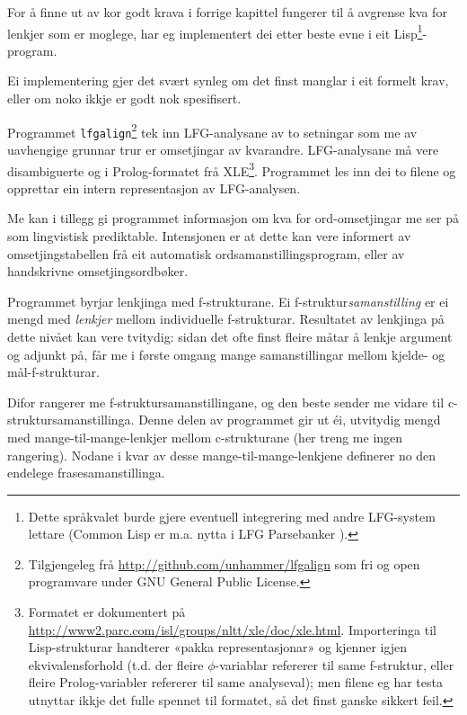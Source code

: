 \documentclass[11pt,a4paper,oneside,draft]{book}
\begin{document}
\label{SEC:implementasjon}

For å finne ut av kor godt krava i forrige kapittel fungerer til å
avgrense kva for lenkjer som er moglege, har eg implementert dei etter
beste evne i eit Lisp\footnote{Dette språkvalet burde gjere eventuell integrering med andre
        LFG-system lettare (Common Lisp er m.a. nytta i LFG
        Parsebanker \citep{rosen2009lpt}). }-program.

 Ei implementering gjer det svært synleg om det finst
manglar i eit formelt krav, eller om noko ikkje er godt nok
spesifisert.

Programmet \texttt{lfgalign}\footnote{Tilgjengeleg frå \href{http://github.com/unhammer/lfgalign}{http://github.com/unhammer/lfgalign} som fri og
       open programvare under GNU General Public License. } tek inn LFG-analysane av to
setningar som me av uavhengige grunnar trur er omsetjingar av
kvarandre. LFG-analysane må vere disambiguerte og i Prolog-formatet
frå XLE\footnote{Formatet er dokumentert på
       \href{http://www2.parc.com/isl/groups/nltt/xle/doc/xle.html}{http://www2.parc.com/isl/groups/nltt/xle/doc/xle.html}. Importeringa
       til Lisp-strukturar handterer «pakka representasjonar» og
       kjenner igjen ekvivalensforhold (t.d. der fleire
       $\phi$-variablar refererer til same f-struktur, eller fleire
       Prolog-variabler refererer til same analyseval); men filene eg
       har testa utnyttar ikkje det fulle spennet til formatet, så det
       finst ganske sikkert feil. }. Programmet les inn dei to filene og opprettar ein
intern representasjon av LFG-analysen.  

Me kan i tillegg gi programmet informasjon om kva for ord-omsetjingar
me ser på som lingvistisk prediktable. Intensjonen er at dette kan
vere informert av omsetjingstabellen frå eit automatisk
ordsamanstillingsprogram, eller av handskrivne omsetjingsordbøker.

Programmet byrjar lenkjinga med f-strukturane. Ei
f-struktur\emph{samanstilling} er ei mengd med \emph{lenkjer} mellom
individuelle f-strukturar. Resultatet av lenkjinga på dette nivået kan
vere tvitydig: sidan det ofte finst fleire måtar å lenkje argument og
adjunkt på, får me i første omgang mange samanstillingar mellom
kjelde- og mål-f-strukturar.

Difor rangerer me f-struktursamanstillingane, og den beste sender me
vidare til c-struktursamanstillinga. Denne delen av programmet gir ut
éi, utvitydig mengd med mange-til-mange-lenkjer mellom c-strukturane
(her treng me ingen rangering). Nodane i kvar av desse
mange-til-mange-lenkjene definerer no den endelege
frasesamanstillinga.
\end{document}
